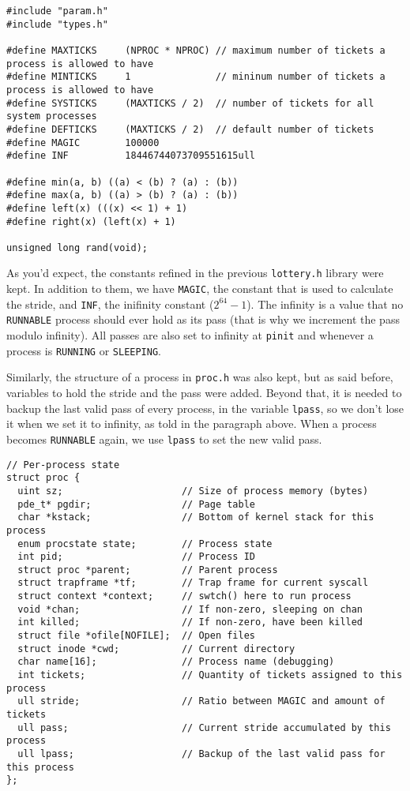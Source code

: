 \documentclass[12pt]{article}
\begin{document}
\begin{scriptsize}
\begin{verbatim}
#include "param.h"
#include "types.h"

#define MAXTICKS     (NPROC * NPROC) // maximum number of tickets a process is allowed to have
#define MINTICKS     1               // mininum number of tickets a process is allowed to have
#define SYSTICKS     (MAXTICKS / 2)  // number of tickets for all system processes
#define DEFTICKS     (MAXTICKS / 2)  // default number of tickets
#define MAGIC        100000
#define INF          18446744073709551615ull

#define min(a, b) ((a) < (b) ? (a) : (b))
#define max(a, b) ((a) > (b) ? (a) : (b))
#define left(x) (((x) << 1) + 1)
#define right(x) (left(x) + 1)

unsigned long rand(void);
\end{verbatim}
\end{scriptsize}

As you'd expect, the constants refined in the previous \texttt{lottery.h} library were kept. In addition to them, we have \texttt{MAGIC}, the constant that is used to calculate the stride, and \texttt{INF}, the inifinity constant ($2^{64} - 1$). The infinity is a value that no \texttt{RUNNABLE} process should ever hold as its pass (that is why we increment the pass modulo infinity). All passes are also set to infinity at \texttt{pinit} and whenever a process is \texttt{RUNNING} or \texttt{SLEEPING}.

Similarly, the structure of a process in \texttt{proc.h} was also kept, but as said before, variables to hold the stride and the pass were added. Beyond that, it is needed to backup the last valid pass of every process, in the variable \texttt{lpass}, so we don't lose it when we set it to infinity, as told in the paragraph above. When a process becomes \texttt{RUNNABLE} again, we use \texttt{lpass} to set the new valid pass.

\begin{scriptsize}
\begin{verbatim}
// Per-process state
struct proc {
  uint sz;                     // Size of process memory (bytes)
  pde_t* pgdir;                // Page table
  char *kstack;                // Bottom of kernel stack for this process
  enum procstate state;        // Process state
  int pid;                     // Process ID
  struct proc *parent;         // Parent process
  struct trapframe *tf;        // Trap frame for current syscall
  struct context *context;     // swtch() here to run process
  void *chan;                  // If non-zero, sleeping on chan
  int killed;                  // If non-zero, have been killed
  struct file *ofile[NOFILE];  // Open files
  struct inode *cwd;           // Current directory
  char name[16];               // Process name (debugging)
  int tickets;                 // Quantity of tickets assigned to this process
  ull stride;                  // Ratio between MAGIC and amount of tickets
  ull pass;                    // Current stride accumulated by this process
  ull lpass;                   // Backup of the last valid pass for this process
};
\end{verbatim}
\end{scriptsize}
\end{document}
